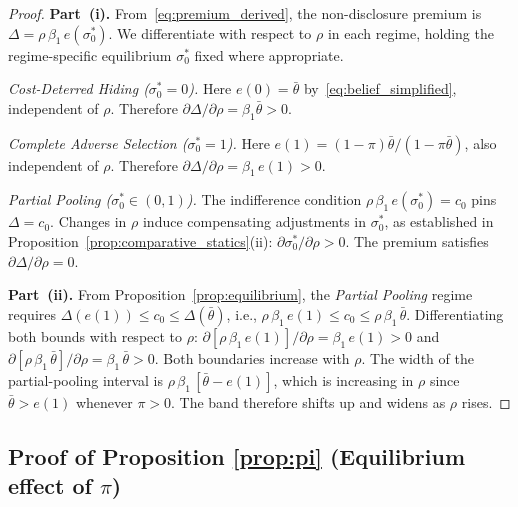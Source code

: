 \documentclass[10pt,letterpaper]{bp-template-concise}
\begin{document}
\begin{proof}
\textbf{Part~(i).}
From~\eqref{eq:premium_derived}, the non-disclosure premium is $\Delta = \rho\,\beta_1\,e(\sigma_0^*)$. We differentiate with respect to $\rho$ in each regime, holding the regime-specific equilibrium $\sigma_0^*$ fixed where appropriate.

\medskip
\textit{Cost-Deterred Hiding ($\sigma_0^* = 0$).} Here $e(0) = \bar{\theta}$ by~\eqref{eq:belief_simplified}, independent of $\rho$. Therefore $\partial\Delta/\partial\rho = \beta_1\bar{\theta} > 0$.

\textit{Complete Adverse Selection ($\sigma_0^* = 1$).} Here $e(1) = (1-\pi)\bar{\theta}/(1-\pi\bar{\theta})$, also independent of $\rho$. Therefore $\partial\Delta/\partial\rho = \beta_1\,e(1) > 0$.

\textit{Partial Pooling ($\sigma_0^*\in(0,1)$).} The indifference condition $\rho\,\beta_1\,e(\sigma_0^*) = c_0$ pins $\Delta = c_0$. Changes in $\rho$ induce compensating adjustments in $\sigma_0^*$, as established in Proposition~\ref{prop:comparative_statics}(ii): $\partial\sigma_0^*/\partial\rho > 0$. The premium satisfies $\partial\Delta/\partial\rho = 0$.

\medskip
\textbf{Part~(ii).}
From Proposition~\ref{prop:equilibrium}, the \emph{Partial Pooling} regime requires $\Delta(e(1)) \leq c_0 \leq \Delta(\bar{\theta})$, i.e., $\rho\,\beta_1\,e(1) \leq c_0 \leq \rho\,\beta_1\,\bar{\theta}$. Differentiating both bounds with respect to $\rho$: $\partial[\rho\,\beta_1\,e(1)]/\partial\rho = \beta_1\,e(1) > 0$ and $\partial[\rho\,\beta_1\,\bar{\theta}]/\partial\rho = \beta_1\,\bar{\theta} > 0$. Both boundaries increase with $\rho$. The width of the partial-pooling interval is $\rho\,\beta_1\,[\bar{\theta} - e(1)]$, which is increasing in $\rho$ since $\bar{\theta} > e(1)$ whenever $\pi > 0$. The band therefore shifts up and widens as $\rho$ rises.
\end{proof}

\subsection*{Proof of Proposition \ref{prop:pi} (Equilibrium effect of $\pi$)}
\end{document}

